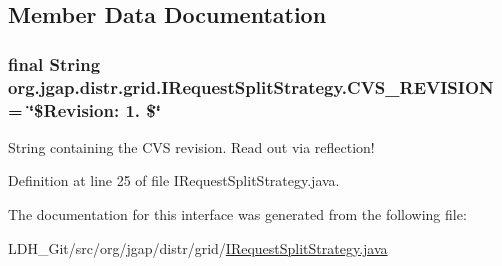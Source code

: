 \subsection{Member Data Documentation}
\hypertarget{interfaceorg_1_1jgap_1_1distr_1_1grid_1_1_i_request_split_strategy_aef08b28ef1455714a55e1cdd37acca64}{
\subsubsection[{C\-V\-S\-\_\-\-R\-E\-V\-I\-S\-I\-O\-N}]{\setlength{\rightskip}{0pt plus 5cm}final String org.\-jgap.\-distr.\-grid.\-I\-Request\-Split\-Strategy.\-C\-V\-S\-\_\-\-R\-E\-V\-I\-S\-I\-O\-N = \char`\"{}\$Revision\-: 1. \$\char`\"{}\hspace{0.3cm}{\ttfamily [static]}}}\label{interfaceorg_1_1jgap_1_1distr_1_1grid_1_1_i_request_split_strategy_aef08b28ef1455714a55e1cdd37acca64}
String containing the C\-V\-S revision. Read out via reflection! 

Definition at line 25 of file I\-Request\-Split\-Strategy.\-java.



The documentation for this interface was generated from the following file\-:\begin{DoxyCompactItemize}
\item 
L\-D\-H\-\_\-\-Git/src/org/jgap/distr/grid/\hyperlink{_i_request_split_strategy_8java}{I\-Request\-Split\-Strategy.\-java}\end{DoxyCompactItemize}
